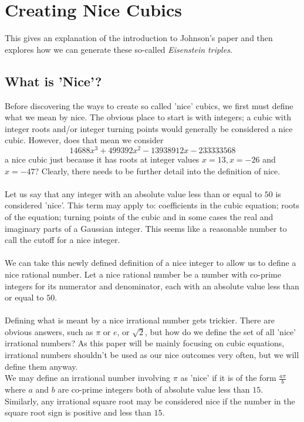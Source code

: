 \documentclass[12pt]{article}
\begin{document}
\pagebreak 

\section{Creating Nice Cubics}
This gives an explanation of the introduction to Johnson's paper and then explores how we can generate these so-called \textit{Eisenstein triples}.

\subsection{What is 'Nice'?}
Before discovering the ways to create so called 'nice' cubics, we first must define what we mean by nice. The obvious place to start is with integers; a cubic with integer roots and/or integer turning points would generally be considered a nice cubic. However, does that mean we consider $$14688x^3+499392x^2-13938912x-233333568$$ a nice cubic just because it has roots at integer values $x=13, x=-26$ and $x=-47$? Clearly, there needs to be further detail into the definition of nice.\\\\
Let us say that any integer with an absolute value less than or equal to $50$ is considered 'nice'. This term may apply to: coefficients in the cubic equation; roots of the equation; turning points of the cubic and in some cases the real and imaginary parts of a Gaussian integer. This seems like a reasonable number to call the cutoff for a nice integer.\\\\
We can take this newly defined definition of a nice integer to allow us to define a nice rational number. Let a nice rational number be a number with co-prime integers for its numerator and denominator, each with an absolute value less than or equal to $50$.\\\\
Defining what is meant by a nice irrational number gets trickier. There are obvious answers, such as $\pi$ or $e$, or $\sqrt{2}$, but how do we define the set of all 'nice' irrational numbers? As this paper will be mainly focusing on cubic equations, irrational numbers shouldn't be used as our nice outcomes very often, but we will define them anyway.\\
We may define an irrational number involving $\pi$ as 'nice' if it is of the form $\frac{a\pi}{b}$ where $a$ and $b$ are co-prime integers both of absolute value less than $15$.\\
Similarly, any irrational square root may be considered nice if the number in the square root sign is positive and less than $15$.
\end{document}
